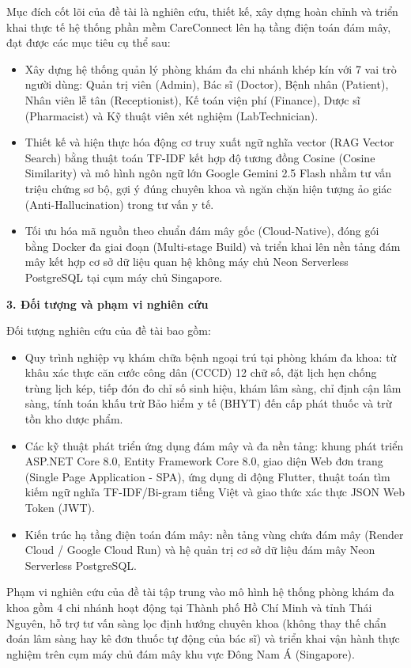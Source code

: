 Mục đích cốt lõi của đề tài là nghiên cứu, thiết kế, xây dựng hoàn chỉnh và triển khai thực tế hệ thống phần mềm CareConnect lên hạ tầng điện toán đám mây, đạt được các mục tiêu cụ thể sau:
\begin{itemize}
    \item Xây dựng hệ thống quản lý phòng khám đa chi nhánh khép kín với 7 vai trò người dùng: Quản trị viên (Admin), Bác sĩ (Doctor), Bệnh nhân (Patient), Nhân viên lễ tân (Receptionist), Kế toán viện phí (Finance), Dược sĩ (Pharmacist) và Kỹ thuật viên xét nghiệm (LabTechnician).
    \item Thiết kế và hiện thực hóa động cơ truy xuất ngữ nghĩa vector (RAG Vector Search) bằng thuật toán TF-IDF kết hợp độ tương đồng Cosine (Cosine Similarity) và mô hình ngôn ngữ lớn Google Gemini 2.5 Flash nhằm tư vấn triệu chứng sơ bộ, gợi ý đúng chuyên khoa và ngăn chặn hiện tượng ảo giác (Anti-Hallucination) trong tư vấn y tế.
    \item Tối ưu hóa mã nguồn theo chuẩn đám mây gốc (Cloud-Native), đóng gói bằng Docker đa giai đoạn (Multi-stage Build) và triển khai lên nền tảng đám mây kết hợp cơ sở dữ liệu quan hệ không máy chủ Neon Serverless PostgreSQL tại cụm máy chủ Singapore.
\end{itemize}

\textbf{3. Đối tượng và phạm vi nghiên cứu}

Đối tượng nghiên cứu của đề tài bao gồm:
\begin{itemize}
    \item Quy trình nghiệp vụ khám chữa bệnh ngoại trú tại phòng khám đa khoa: từ khâu xác thực căn cước công dân (CCCD) 12 chữ số, đặt lịch hẹn chống trùng lịch kép, tiếp đón đo chỉ số sinh hiệu, khám lâm sàng, chỉ định cận lâm sàng, tính toán khấu trừ Bảo hiểm y tế (BHYT) đến cấp phát thuốc và trừ tồn kho dược phẩm.
    \item Các kỹ thuật phát triển ứng dụng đám mây và đa nền tảng: khung phát triển ASP.NET Core 8.0, Entity Framework Core 8.0, giao diện Web đơn trang (Single Page Application - SPA), ứng dụng di động Flutter, thuật toán tìm kiếm ngữ nghĩa TF-IDF/Bi-gram tiếng Việt và giao thức xác thực JSON Web Token (JWT).
    \item Kiến trúc hạ tầng điện toán đám mây: nền tảng vùng chứa đám mây (Render Cloud / Google Cloud Run) và hệ quản trị cơ sở dữ liệu đám mây Neon Serverless PostgreSQL.
\end{itemize}

Phạm vi nghiên cứu của đề tài tập trung vào mô hình hệ thống phòng khám đa khoa gồm 4 chi nhánh hoạt động tại Thành phố Hồ Chí Minh và tỉnh Thái Nguyên, hỗ trợ tư vấn sàng lọc định hướng chuyên khoa (không thay thế chẩn đoán lâm sàng hay kê đơn thuốc tự động của bác sĩ) và triển khai vận hành thực nghiệm trên cụm máy chủ đám mây khu vực Đông Nam Á (Singapore).

